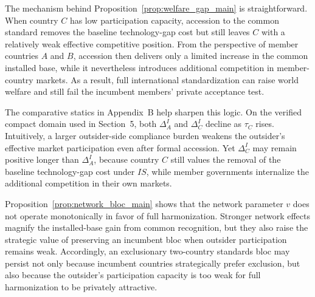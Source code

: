 The mechanism behind Proposition~\ref{prop:welfare_gap_main} is straightforward.
When country $C$ has low participation capacity, accession to the common
standard removes the baseline technology-gap cost but still leaves $C$ with a
relatively weak effective competitive position. From the perspective of member
countries $A$ and $B$, accession then delivers only a limited increase in the
common installed base, while it nevertheless introduces additional competition
in member-country markets. As a result, full international standardization can
raise world welfare and still fail the incumbent members' private acceptance
test.

The comparative statics in Appendix~B help sharpen this logic. On the verified
compact domain used in Section~5, both $\Delta_A^I$ and $\Delta_C^I$ decline as
$\tau_C$ rises. Intuitively, a larger outsider-side compliance burden weakens
the outsider's effective market participation even after formal accession. Yet
$\Delta_C^I$ may remain positive longer than $\Delta_A^I$, because country $C$
still values the removal of the baseline technology-gap cost under $IS$, while
member governments internalize the additional competition in their own markets.

Proposition~\ref{prop:network_bloc_main} shows that the network parameter $v$
does not operate monotonically in favor of full harmonization. Stronger network
effects magnify the installed-base gain from common recognition, but they also
raise the strategic value of preserving an incumbent bloc when outsider
participation remains weak. Accordingly, an exclusionary two-country standards
bloc may persist not only because incumbent countries strategically prefer
exclusion, but also because the outsider's participation capacity is too weak
for full harmonization to be privately attractive.
